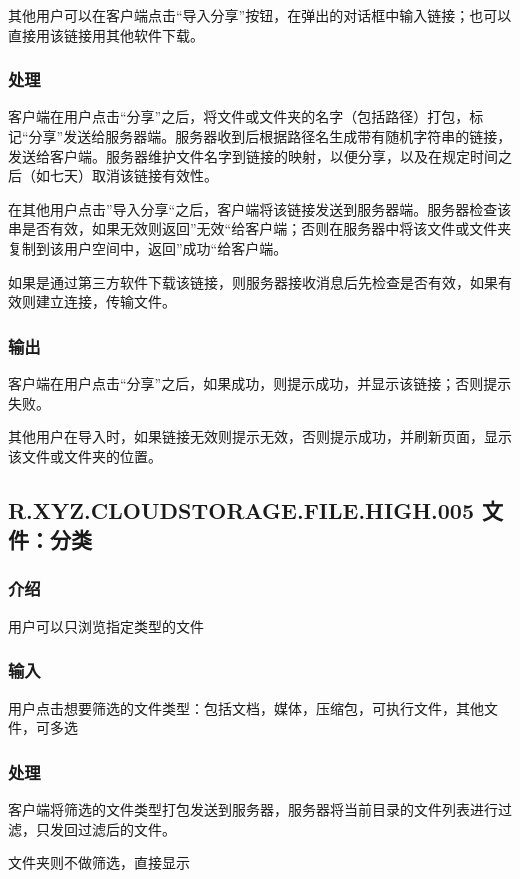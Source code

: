 其他用户可以在客户端点击“导入分享”按钮，在弹出的对话框中输入链接；也可以直接用该链接用其他软件下载。

\subsubsection{处理} 
客户端在用户点击“分享”之后，将文件或文件夹的名字（包括路径）打包，标记“分享”发送给服务器端。服务器收到后根据路径名生成带有随机字符串的链接，发送给客户端。服务器维护文件名字到链接的映射，以便分享，以及在规定时间之后（如七天）取消该链接有效性。

在其他用户点击”导入分享“之后，客户端将该链接发送到服务器端。服务器检查该串是否有效，如果无效则返回”无效“给客户端；否则在服务器中将该文件或文件夹复制到该用户空间中，返回”成功“给客户端。

如果是通过第三方软件下载该链接，则服务器接收消息后先检查是否有效，如果有效则建立连接，传输文件。

\subsubsection{输出} 
客户端在用户点击“分享”之后，如果成功，则提示成功，并显示该链接；否则提示失败。
 
其他用户在导入时，如果链接无效则提示无效，否则提示成功，并刷新页面，显示该文件或文件夹的位置。



\subsection{R.XYZ.CLOUDSTORAGE.FILE.HIGH.005 文件：分类}

\subsubsection{介绍}
用户可以只浏览指定类型的文件

\subsubsection{输入} 
用户点击想要筛选的文件类型：包括文档，媒体，压缩包，可执行文件，其他文件，可多选

\subsubsection{处理} 
客户端将筛选的文件类型打包发送到服务器，服务器将当前目录的文件列表进行过滤，只发回过滤后的文件。

文件夹则不做筛选，直接显示

